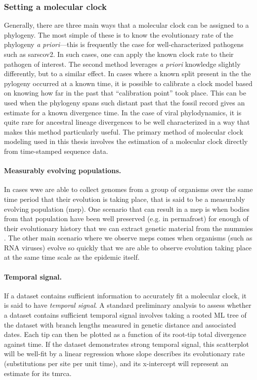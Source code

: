 \subsubsection{Setting a molecular clock}
Generally, there are three main ways that a molecular clock can be assigned to a phylogeny.
The most simple of these is to know the evolutionary rate of the phylogeny \textit{a priori}---this is frequently the case for well-characterized pathogens such as \gls{sarscov2}.
In such cases, one can apply the known clock rate to their pathogen of interest.
The second method leverages \textit{a priori} knowledge slightly differently, but to a similar effect.
In cases where a known split present in the the pylogeny occurred at a known time, it is possible to calibrate a clock model based on knowing how far in the past that ``calibration point'' took place.
This can be used when the phylogeny spans such distant past that the fossil record gives an estimate for a known divergence time.
In the case of viral phylodynamics, it is quite rare for ancestral lineage divergences to be well characterized in a way that makes this method particularly useful.
The primary method of molecular clock modeling used in this thesis involves the estimation of a molecular clock directly from time-stamped sequence data.

\paragraph*{Measurably evolving populations.}
In cases wwe are able to collect genomes from a group of organisms over the same time period that their evolution is taking place, that is said to be a measurably evolving population (\gls{mep}).
One scenario that can result in a \gls{mep} is when bodies from that population have been well preserved (e.g. in permafrost) for enough of their evolutionary history that we can extract genetic material from the mummies \citep{shapiro2004rise}.
The other main scenario where we observe \gls{mep}s comes when organisms (such as RNA viruses) evolve so quickly that we are able to observe evolution taking place at the same time scale as the epidemic itself.

\paragraph*{Temporal signal.}
If a dataset contains sufficient information to accurately fit a molecular clock, it is said to have \textit{temporal signal}.
A standard preliminary analysis to assess whether a dataset contains sufficient temporal signal involves taking a rooted ML tree of the dataset with branch lengths measured in genetic distance and associated dates.
Each tip can then be plotted as a function of its root-tip total divergence against time.
If the dataset demonstrates strong temporal signal, this scatterplot will be well-fit by a linear regression whose slope describes its evolutionary rate (substitutions per site per unit time), and its x-intercept will represent an estimate for its \gls{tmrca}.

